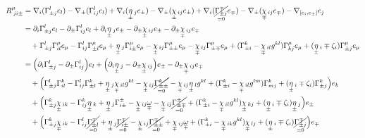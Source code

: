 \documentclass[a4paper,11pt]{article}
\numberwithin{equation}{section}
\theoremstyle{definition}
\begin{document}
\begin{align*}
    R^\mu_{\;ji\pm} &= \nabla_i(\Gamma_{\pm j}^l e_l) - \nabla_\pm (\Gamma_{i j}^l e_l) + \nabla_i(\underset{\pm}{\eta}\,_j e_\pm) - \nabla_\pm (\underset{\pm}{\chi}\,_{ij} e_\pm) + \nabla_i(\underset{=0}{\cancel{\Gamma_{\pm j}^\mp}} e_\mp) - \nabla_\pm (\underset{\mp}{\chi}\,_{ij} e_\mp) - \nabla_{[e_i,e_\pm]}e_j\\
    &= \partial_i\Gamma_{\pm j}^l e_l - \partial_\pm \Gamma_{i j}^l e_l + \partial_i\underset{\pm}{\eta}\,_j e_\pm - \partial_\pm \underset{\pm}{\chi}\,_{ij} e_\pm - \partial_\pm \underset{\mp}{\chi}\,_{ij} e_\mp\\ 
    &\quad + \Gamma_{\pm j}^l\Gamma_{il}^\mu e_\mu - \Gamma_{i j}^l\Gamma_{\pm l}^\mu e_\mu + \underset{\pm}{\eta}\,_j\Gamma_{i\pm}^\mu e_\mu - \underset{\pm}{\chi}\,_{ij}\Gamma_{\pm \pm}^\mu e_\mu - \underset{\mp}{\chi}\,_{ij}\Gamma_{\pm\mp}^\mu e_\mu + (\Gamma_{\pm i}^k - \underset{\mp}{\chi}\,_{il}g^{kl})\Gamma_{k j}^\mu e_\mu+(\underset{\pm}{\eta}\,_i \mp \zeta_i)\Gamma_{\pm j}^\mu e_\mu\\
    &= \Big(\partial_i\Gamma_{\pm j}^l - \partial_\pm \Gamma_{i j}^l \Big) e_l + \Big(\partial_i\underset{\pm}{\eta}\,_j - \partial_\pm \underset{\pm}{\chi}\,_{ij} \Big)e_\pm - \partial_\pm \underset{\mp}{\chi}\,_{ij} e_\mp\\ 
    &\quad + \Big(\Gamma_{\pm j}^l\Gamma_{il}^k - \Gamma_{i j}^l\Gamma_{\pm l}^k + \underset{\pm}{\eta}\,_j\underset{\mp}{\chi}\,_{il}g^{kl} - \underset{\pm}{\chi}\,_{ij}\underset{=0}{\cancel{\Gamma_{\pm \pm}^k}} - \underset{\mp}{\chi}\,_{ij}\underset{\pm}{\eta}\,_lg^{kl} + (\Gamma_{\pm i}^k - \underset{\mp}{\chi}\,_{il}g^{lm})\Gamma_{m j}^k +(\underset{\pm}{\eta}\,_i \mp \zeta_i)\Gamma_{\pm j}^k \Big)e_k\\ 
    &\quad + \Big(\Gamma_{\pm j}^k\underset{\pm}{\chi}\,_{ik} - \Gamma_{i j}^k\underset{\pm}{\eta}\,_k + \underset{\pm}{\eta}\,_j\Gamma_{i\pm}^\pm - \underset{\pm}{\chi}\,_{ij}\underset{\mp}{\omega} - \underset{\mp}{\chi}\,_{ij}\underset{=0}{\cancel{\Gamma_{\pm\mp}^\pm}} + (\Gamma_{\pm i}^k - \underset{\mp}{\chi}\,_{il}g^{kl})\underset{\pm}{\chi}\,_{k j} +(\underset{\pm}{\eta}\,_i \mp \zeta_i)\underset{\pm}{\eta}\,_j \Big)e_\pm\\ 
    &\quad + \Big(\Gamma_{\pm j}^k\underset{\mp}{\chi}\,_{ik} - \Gamma_{i j}^l\underset{=0}{\cancel{\Gamma_{\pm l}^\mp}} + \underset{\pm}{\eta}\,_j\underset{=0}{\cancel{\Gamma_{i\pm}^\mp}} - \underset{\pm}{\chi}\,_{ij}\underset{=0}{\cancel{\Gamma_{\pm \pm}^\mp}} + \underset{\mp}{\chi}\,_{ij}\underset{\mp}{\omega} + (\Gamma_{\pm i}^k - \underset{\mp}{\chi}\,_{ik}g^{kl})\underset{\mp}{\chi}\,_{l j} +(\underset{\pm}{\eta}\,_i \mp \zeta_i)\underset{=0}{\cancel{\Gamma_{\pm j}^\mp}} \Big)e_\mp
\end{align*}
\end{document}
